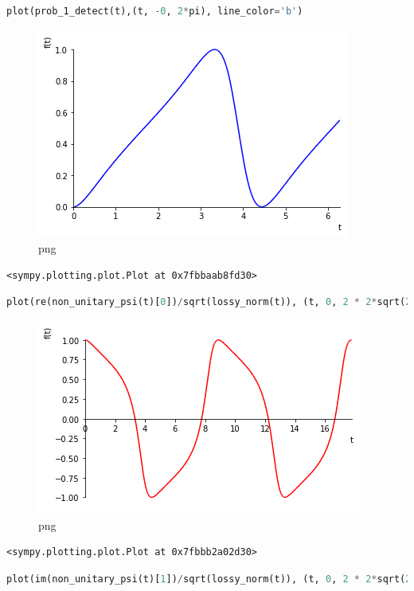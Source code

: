 \begin{lstlisting}[language=Python]
plot(prob_1_detect(t),(t, -0, 2*pi), line_color='b')
\end{lstlisting}

\begin{figure}
\centering
\includegraphics[width=0.66\linewidth]{output_34_0.png}
\caption{png}
\end{figure}

\begin{lstlisting}
<sympy.plotting.plot.Plot at 0x7fbbaab8fd30>
\end{lstlisting}

\begin{lstlisting}[language=Python]
plot(re(non_unitary_psi(t)[0])/sqrt(lossy_norm(t)), (t, 0, 2 * 2*sqrt(2)*pi), line_color='r')
\end{lstlisting}

\begin{figure}
\centering
\includegraphics[width=0.66\linewidth]{output_35_0.png}
\caption{png}
\end{figure}

\begin{lstlisting}
<sympy.plotting.plot.Plot at 0x7fbbb2a02d30>
\end{lstlisting}

\begin{lstlisting}[language=Python]
plot(im(non_unitary_psi(t)[1])/sqrt(lossy_norm(t)), (t, 0, 2 * 2*sqrt(2)*pi), line_color='b')
\end{lstlisting}

